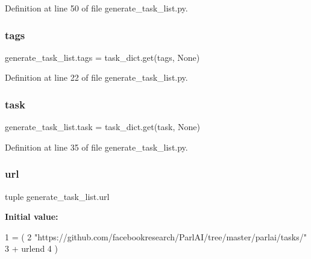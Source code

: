Definition at line 50 of file generate\+\_\+task\+\_\+list.\+py.

\mbox{\label{namespacegenerate__task__list_ad95d77ecc0bed7196aa01e9576c8ecc1}} 
\subsubsection{\texorpdfstring{tags}{tags}}
{\footnotesize\ttfamily generate\+\_\+task\+\_\+list.\+tags = task\+\_\+dict.\+get(\textquotesingle{}tags\textquotesingle{}, None)}



Definition at line 22 of file generate\+\_\+task\+\_\+list.\+py.

\mbox{\label{namespacegenerate__task__list_a6a85e730374a68f9195f2e0e4fc09a9a}} 
\subsubsection{\texorpdfstring{task}{task}}
{\footnotesize\ttfamily generate\+\_\+task\+\_\+list.\+task = task\+\_\+dict.\+get(\textquotesingle{}task\textquotesingle{}, None)}



Definition at line 35 of file generate\+\_\+task\+\_\+list.\+py.

\mbox{\label{namespacegenerate__task__list_a44c805c529a26ee211795d8c7064facb}} 
\subsubsection{\texorpdfstring{url}{url}}
{\footnotesize\ttfamily tuple generate\+\_\+task\+\_\+list.\+url}

{\bfseries Initial value\+:}
\begin{DoxyCode}
1 =  (
2             \textcolor{stringliteral}{"https://github.com/facebookresearch/ParlAI/tree/master/parlai/tasks/"}
3             + urlend
4         )
\end{DoxyCode}


